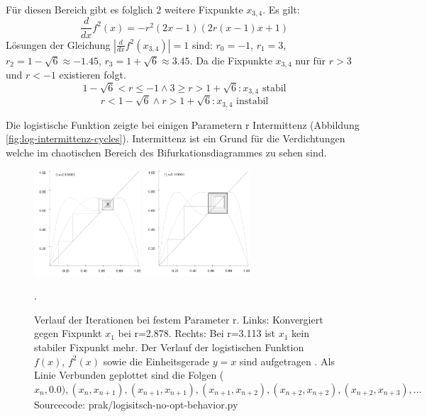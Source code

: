 \documentclass[12pt,a4paper]{article}
\begin{document}
Für diesen Bereich gibt es folglich 2 weitere Fixpunkte $x_{3,4}$. 
Es gilt:
\begin{equation}
\frac{d}{dx}f^2(x)=-r^2(2x-1)(2r(x-1)x+1)
\end{equation}
Lösungen der Gleichung $|\frac{d}{dx}f^2(x_{3,4})|=1$ sind: $r_0=-1$, $r_1=3$, $r_2=1-\sqrt{6}\approx-1.45$, $r_3=1+\sqrt{6}\approx3.45$. Da die Fixpunkte $x_{3,4}$ nur für $r>3$ und $r<-1$ existieren folgt.
\begin{equation}1-\sqrt{6}< r \leq -1 \wedge 3 \geq r > 1+\sqrt{6}: x_{3,4} \text{ stabil}
\end{equation}
\begin{equation}r < 1-\sqrt{6} \wedge r>1+\sqrt{6}: x_{3,4} \text{ instabil}
\end{equation}

Die logistische Funktion zeigte bei einigen Parametern r Intermittenz (Abbildung \ref{fig:log-intermittenz-cycles}). Intermittenz ist ein Grund für die Verdichtungen welche im chaotischen Bereich des Bifurkationsdiagrammes zu sehen sind.

\begin{figure}[!htbp]
\centering
\includegraphics[height=150px]{fixpunkt-2878}
\includegraphics[height=150px]{fixpunkt-311}
\caption{Verlauf der Iterationen bei festem Parameter r. Links: Konvergiert gegen Fixpunkt $x_1$ bei r=2.878. Rechts: Bei r=3.113 ist $x_1$ kein stabiler Fixpunkt mehr. Der Verlauf der logistischen Funktion $f(x)$, $f^2(x)$ sowie die Einheitsgerade $y=x$ sind aufgetragen . Als Linie Verbunden geplottet sind die Folgen ($x_n, 0.0), (x_n, x_{n+1}), (x_{n+1}, x_{n+1}), (x_{n+1}, x_{n+2}), (x_{n+2}, x_{n+2}), (x_{n+2}, x_{n+3}), ...$ Sourcecode: prak/logisitsch-no-opt-behavior.py}. 
\label{fig:log-iteration-behavior}
\end{figure}
\end{document}
